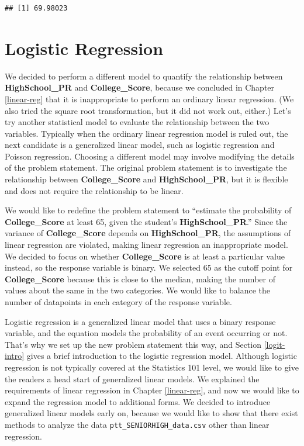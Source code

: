 \documentclass[
]{article}
\begin{document}
\begin{verbatim}
## [1] 69.98023
\end{verbatim}

\hypertarget{logit-reg}{%
\section{Logistic Regression}\label{logit-reg}}

We decided to perform a different model to quantify the relationship
between \textbf{HighSchool\_PR} and \textbf{College\_Score}, because we
concluded in Chapter \ref{linear-reg} that it is inappropriate to
perform an ordinary linear regression. (We also tried the square root
transformation, but it did not work out, either.) Let's try another
statistical model to evaluate the relationship between the two
variables. Typically when the ordinary linear regression model is ruled
out, the next candidate is a generalized linear model, such as logistic
regression and Poisson regression. Choosing a different model may
involve modifying the details of the problem statement. The original
problem statement is to investigate the relationship between
\textbf{College\_Score} and \textbf{HighSchool\_PR}, but it is flexible
and does not require the relationship to be linear.

We would like to redefine the problem statement to ``estimate the
probability of \textbf{College\_Score} at least 65, given the student's
\textbf{HighSchool\_PR}.'' Since the variance of \textbf{College\_Score}
depends on \textbf{HighSchool\_PR}, the assumptions of linear regression
are violated, making linear regression an inappropriate model. We
decided to focus on whether \textbf{College\_Score} is at least a
particular value instead, so the response variable is binary. We
selected 65 as the cutoff point for \textbf{College\_Score} because this
is close to the median, making the number of values about the same in
the two categories. We would like to balance the number of datapoints in
each category of the response variable.

Logistic regression is a generalized linear model that uses a binary
response variable, and the equation models the probability of an event
occurring or not. That's why we set up the new problem statement this
way, and Section \ref{logit-intro} gives a brief introduction to the
logistic regression model. Although logistic regression is not typically
covered at the Statistics 101 level, we would like to give the readers a
head start of generalized linear models. We explained the requirements
of linear regression in Chapter \ref{linear-reg}, and now we would like
to expand the regression model to additional forms. We decided to
introduce generalized linear models early on, because we would like to
show that there exist methods to analyze the data
\texttt{ptt\_SENIORHIGH\_data.csv} other than linear regression.
\end{document}
